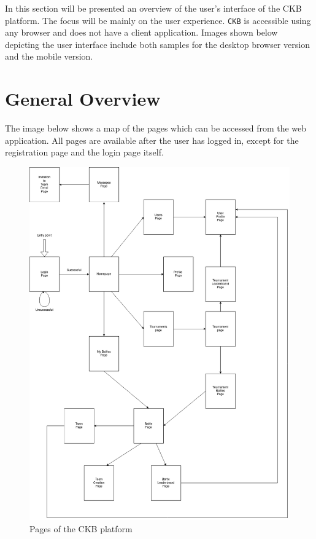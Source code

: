In this section will be presented an overview of the user’s interface of the CKB platform.
The focus will be mainly on the user experience. 
\verb|CKB| is accessible using any browser and does not have a client application.
Images shown below depicting the user interface include both samples for the desktop browser version and the mobile version.

\section{General Overview}
\label{sec: general_overview}%
The image below shows a map of the pages which can be accessed from the web application.
All pages are available after the user has logged in, except for the registration page and the login page itself.

\begin{figure} [H]
    \begin{center}
        \includegraphics[width=1\linewidth]{Images/designmap.png}
        \caption{Pages of the CKB platform}
        \label{fig: designmap}
    \end{center}
\end{figure}

